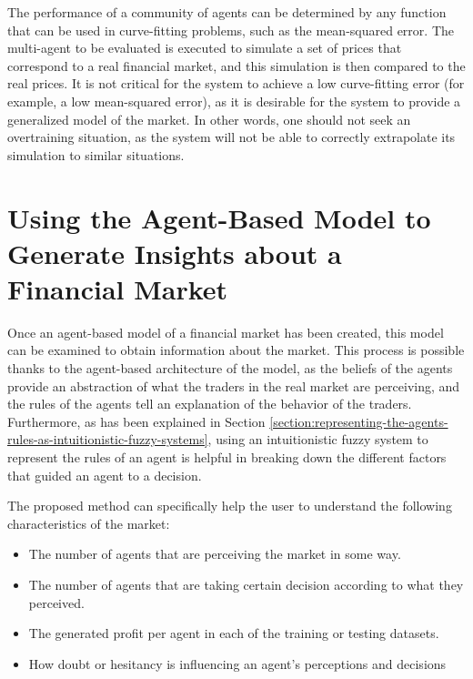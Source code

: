 The performance of a community of agents can be determined by any function that
can be used in curve-fitting problems, such as the mean-squared error. The
multi-agent to be evaluated is executed to simulate a set of prices that
correspond to a real financial market, and this simulation is then compared to
the real prices. It is not critical for the system to achieve a low
curve-fitting error (for example, a low mean-squared error), as it is desirable
for the system to provide a generalized model of the market. In other words, one
should not seek an overtraining situation, as the system will not be able to
correctly extrapolate its simulation to similar situations.

\section{Using the Agent-Based Model to Generate Insights about a Financial
Market}
\label{section:using-the-agent-based-model-to-generate-insights-about-a-financial-market}

Once an agent-based model of a financial market has been created, this model can
be examined to obtain information about the market. This process is possible
thanks to the agent-based architecture of the model, as the beliefs of the
agents provide an abstraction of what the traders in the real market are
perceiving, and the rules of the agents tell an explanation of the behavior of
the traders. Furthermore, as has been explained in Section
\ref{section:representing-the-agents-rules-as-intuitionistic-fuzzy-systems},
using an intuitionistic fuzzy system to represent the rules of an agent is
helpful in breaking down the different factors that guided an agent to a
decision.

The proposed method can specifically help the user to understand the following
characteristics of the market:

\begin{itemize}
\item \label{item:agents-perception} The number of agents that are perceiving
  the market in some way.
\item \label{item:agents-decisions} The number of agents that are taking certain
  decision according to what they perceived.
\item \label{item:agents-profit} The generated profit per agent in each of the
  training or testing datasets.
\item \label{item:agents-doubt} How doubt or hesitancy is influencing an agent's
  perceptions and decisions
\end{itemize}

